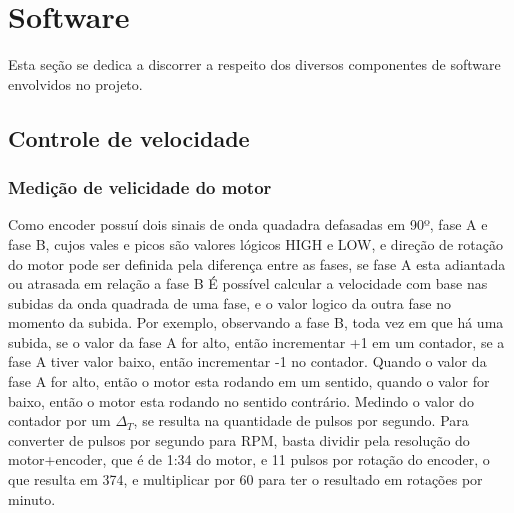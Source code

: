


\section{Software}
{\color{red} Esta seção se dedica a discorrer a respeito dos diversos componentes de software envolvidos no projeto.}

\subsection{Controle de velocidade}

\subsubsection{Medição de velicidade do motor}

Como encoder possuí dois sinais de onda quadadra defasadas em 90º, fase A e fase B, cujos vales e picos são valores lógicos HIGH e LOW, 
e direção de rotação do motor pode ser definida pela diferença entre as fases, se fase A esta adiantada ou atrasada em relação a fase B
É possível calcular a velocidade com base nas subidas da onda quadrada de uma fase, e o valor logico da outra fase no momento da subida.
Por exemplo,  observando a fase B, toda vez em que há uma subida, se o valor da fase A for alto, então incrementar +1 em um contador, se a fase A tiver valor baixo, então incrementar -1 no contador.
Quando o valor da fase A for alto, então o motor esta rodando em um sentido,  quando o valor  for baixo, então o motor esta rodando no sentido contrário.
Medindo o valor do contador por um $\Delta_{T}$, se resulta na quantidade de pulsos por segundo.
Para converter de pulsos por segundo para RPM, basta dividir pela resolução do motor+encoder,  que é de 1:34 do motor, e 11 pulsos por rotação do encoder, o que resulta em 374,
e multiplicar por 60 para ter o resultado em rotações por minuto.

